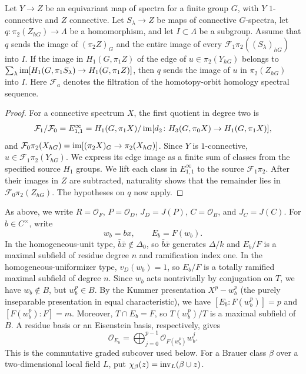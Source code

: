 \begin{lemma}
\label{lem:review-generic-source-edge-generation}
Let $Y\to Z$ be an equivariant map of spectra for a finite group $G$, with $Y$ $1$-connective and $Z$ connective.
Let $S_\lambda\to Z$ be maps of connective $G$-spectra, let $q\colon\pi_2(Z_{hG})\to \Lambda$ be a homomorphism, and let $I\subset \Lambda$ be a subgroup.
Assume that $q$ sends the image of $(\pi_2Z)_G$ and the entire image of every $\mathcal F_1\pi_2((S_\lambda)_{hG})$ into $I$.
If the image in $H_1(G,\pi_1Z)$ of the edge of $u\in\pi_2(Y_{hG})$ belongs to $\sum_\lambda\operatorname{im}[H_1(G,\pi_1S_\lambda)\to H_1(G,\pi_1Z)]$, then $q$ sends the image of $u$ in $\pi_2(Z_{hG})$ into $I$.
Here $\mathcal F_a$ denotes the filtration of the homotopy-orbit homology spectral sequence.
\end{lemma}
\begin{proof}
For a connective spectrum $X$, the first quotient in degree two is
\[
 \mathcal F_1/\mathcal F_0=E^\infty_{1,1}
 =H_1(G,\pi_1X)/\operatorname{im}
   [d_2\colon H_3(G,\pi_0X)\to H_1(G,\pi_1X)],
\]
and $\mathcal F_0\pi_2(X_{hG})=\operatorname{im}[(\pi_2X)_G\to\pi_2(X_{hG})]$.
Since $Y$ is $1$-connective, $u\in\mathcal F_1\pi_2(Y_{hG})$.
We express its edge image as a finite sum of classes from the specified source $H_1$ groups.
We lift each class in $E^\infty_{1,1}$ to the source $\mathcal F_1\pi_2$.
After their images in $Z$ are subtracted, naturality shows that the remainder lies in $\mathcal F_0\pi_2(Z_{hG})$.
The hypotheses on $q$ now apply.
\end{proof}

As above, we write $R=\mathcal O_F$, $P=\mathcal O_D$, $J_D=J(P)$, $C=\mathcal O_B$, and $J_C=J(C)$.
For $b\in C^\times$, write
\[
 w_b=bx,\qquad E_b=F(w_b).
\]
In the homogeneous-unit type, $\bar b\bar x\notin\Delta_0$, so $\bar b\bar x$ generates $\Delta/k$ and $E_b/F$ is a maximal subfield of residue degree $n$ and ramification index one.
In the homogeneous-uniformizer type, $v_D(w_b)=1$, so $E_b/F$ is a totally ramified maximal subfield of degree $n$.
Since $w_b$ acts nontrivially by conjugation on $T$, we have $w_b\notin B$, but $w_b^p\in B$.
By the Kummer presentation $X^p-w_b^p$ (the purely inseparable presentation in equal characteristic), we have $[E_b:F(w_b^p)]=p$ and $[F(w_b^p):F]=m$.
Moreover, $T\cap E_b=F$, so $T(w_b^p)/T$ is a maximal subfield of $B$.
A residue basis or an Eisenstein basis, respectively, gives
\[
 \mathcal O_{E_b}=\bigoplus_{j=0}^{p-1}\mathcal O_{F(w_b^p)}w_b^j.
\]
This is the commutative graded subcover used below.
For a Brauer class $\beta$ over a two-dimensional local field $L$, put $\chi_\beta(z)=\operatorname{inv}_L(\beta\cup z)$.

